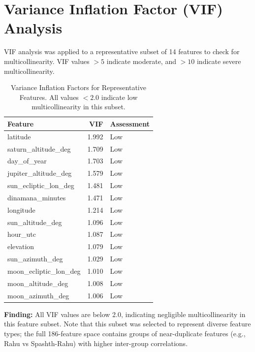 \documentclass[11pt,a4paper]{article}
\begin{document}
\section{Variance Inflation Factor (VIF) Analysis}

VIF analysis was applied to a representative subset of 14 features to check for
multicollinearity. VIF values $> 5$ indicate moderate, and $> 10$ indicate severe
multicollinearity.

\begin{table}[H]
  \centering
  \caption{Variance Inflation Factors for Representative Features.
           All values $< 2.0$ indicate low multicollinearity in this subset.}
  \label{tab:vif}
  \begin{tabular}{lrl}
    \toprule
    Feature & VIF & Assessment \\
    \midrule
  latitude & 1.992 & Low \\
  saturn\_altitude\_deg & 1.709 & Low \\
  day\_of\_year & 1.703 & Low \\
  jupiter\_altitude\_deg & 1.579 & Low \\
  sun\_ecliptic\_lon\_deg & 1.481 & Low \\
  dinamana\_minutes & 1.471 & Low \\
  longitude & 1.214 & Low \\
  sun\_altitude\_deg & 1.096 & Low \\
  hour\_utc & 1.087 & Low \\
  elevation & 1.079 & Low \\
  sun\_azimuth\_deg & 1.029 & Low \\
  moon\_ecliptic\_lon\_deg & 1.010 & Low \\
  moon\_altitude\_deg & 1.008 & Low \\
  moon\_azimuth\_deg & 1.006 & Low \\
    \bottomrule
  \end{tabular}
\end{table}

\noindent\textbf{Finding:} All VIF values are below 2.0, indicating negligible multicollinearity in this feature subset. 
Note that this subset was selected to represent diverse feature types; the full
186-feature space contains groups of near-duplicate features (e.g., Rahu vs Spashth-Rahu)
with higher inter-group correlations.
\end{document}
